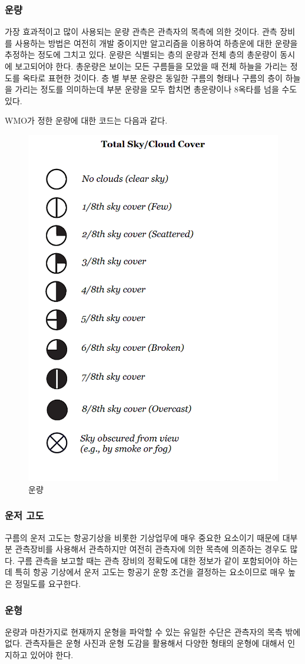 \begin{itemize}
{\subsubsection{운량}
가장 효과적이고 많이 사용되는 운량 관측은 관측자의 목측에 의한 것이다. 관측 장비를 사용하는 방법은 여전히 개발 중이지만 알고리즘을 이용하여 하층운에 대한 운량을 추정하는 정도에 그치고 있다. 운량은 식별되는 층의 운량과 전체 층의 총운량이 동시에 보고되어야 한다. 총운량은 보이는 모든 구름들을 모았을 때 전체 하늘을 가리는 정도를 옥타로 표현한 것이다. 층
별 부분 운량은 동일한 구름의 형태나 구름의 층이 하늘을 가리는 정도를 의미하는데 부분 운량을 모두 합치면 총운량이나 8옥타를 넘을 수도 있다.

WMO가 정한 운량에 대한 코드는 다음과 같다.

\begin{figure}[h]
	\centering
	\includegraphics[width=0.4\linewidth]{21observing/images/sky-cover_key-58b740215f9b5880804caa18}
	\caption{운량}
	\label{fig:okta}
\end{figure}

\subsubsection{운저 고도}
구름의 운저 고도는 항공기상을 비롯한 기상업무에 매우 중요한 요소이기 때문에 대부분 관측장비를 사용해서 관측하지만 여전히 관측자에 의한 목측에 의존하는 경우도 많다. 구름 관측을 보고할 때는 관측 장비의 정확도에 대한 정보가 같이 포함되어야 하는데 특히 항공 기상에서 운저 고도는 항공기 운항 조건을 결정하는 요소이므로 매우 높은 정밀도를 요구한다.

\subsubsection{운형}
운량과 마찬가지로 현재까지 운형을 파악할 수 있는 유일한 수단은 관측자의 목측 밖에 없다. 관측자들은 운형 사진과 운형 도감을 활용해서 다양한 형태의 운형에 대해서 인지하고 있어야 한다.

}
\end{itemize}
